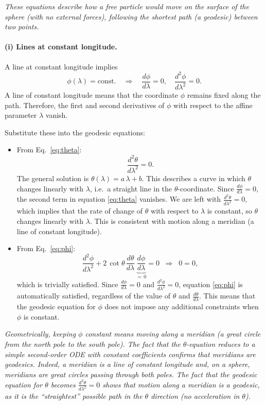 \documentclass{article}
\begin{document}
\emph{These equations describe how a free particle would move on the surface of the sphere (with no external forces), following the shortest path (a geodesic) between two points.}

\paragraph{(i) Lines at constant longitude.}
A line at constant longitude implies
\[
\phi(\lambda) = \text{const.}
\quad\Longrightarrow\quad
\frac{d\phi}{d\lambda} = 0, \quad
\frac{d^2\phi}{d\lambda^2} = 0.
\]
A line of constant longitude means that the coordinate \(\phi\) remains fixed along the path. Therefore, the first and second derivatives of \(\phi\) with respect to the affine parameter \(\lambda\) vanish.

Substitute these into the geodesic equations:
\begin{itemize}
\item From Eq.~\eqref{eq:theta}:
\[
\frac{d^2 \theta}{d\lambda^2} = 0.
\]
The general solution is \(\theta(\lambda) = a\,\lambda + b\). This describes a curve in which \(\theta\) changes linearly with \(\lambda\), i.e.\ a straight line in the \(\theta\)-coordinate. Since \(\tfrac{d\phi}{d\lambda} = 0\), the second term in equation \eqref{eq:theta} vanishes. We are left with \(\tfrac{d^2 \theta}{d\lambda^2} = 0\), which implies that the rate of change of \(\theta\) with respect to \(\lambda\) is constant, so \(\theta\) changes linearly with \(\lambda\). This is consistent with motion along a meridian (a line of constant longitude).

\item From Eq.~\eqref{eq:phi}:
\[
\frac{d^2 \phi}{d\lambda^2}
+ 2 \,\cot\theta\,\frac{d\theta}{d\lambda}\,\underbrace{\frac{d\phi}{d\lambda}}_{=\,0}
= 0
\;\;\Longrightarrow\;\;
0 = 0,
\]
which is trivially satisfied. Since \(\tfrac{d\phi}{d\lambda} = 0\) and \(\tfrac{d^2\phi}{d\lambda^2} = 0\), equation \eqref{eq:phi} is automatically satisfied, regardless of the value of \(\theta\) and \(\tfrac{d\theta}{d\lambda}\). This means that the geodesic equation for \(\phi\) does not impose any additional constraints when \(\phi\) is constant.
\end{itemize}

\emph{Geometrically, keeping \(\phi\) constant means moving along a meridian (a great circle from the north pole to the south pole). The fact that the \(\theta\)-equation reduces to a simple second-order ODE with constant coefficients confirms that meridians are geodesics. Indeed, a meridian is a line of constant longitude and, on a sphere, meridians are great circles passing through both poles. The fact that the geodesic equation for \(\theta\) becomes \(\tfrac{d^2 \theta}{d\lambda^2} = 0\) shows that motion along a meridian is a geodesic, as it is the ``straightest'' possible path in the \(\theta\) direction (no acceleration in \(\theta\)).}
\end{document}
